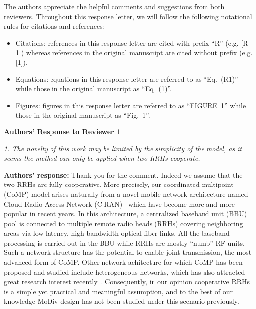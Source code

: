 \documentclass[onecolumn, 11pt, draftclsnofoot]{IEEEtran}
\begin{document}
The authors appreciate the helpful comments and suggestions from both reviewers. 
Throughout this response letter, we will follow the following notational
rules for citations and references:
\begin{itemize}
  \item Citations: references in this response letter are cited with prefix
  ``R'' (e.g. [R 1]) whereas references in the original manuscript are cited
  without prefix (e.g. [1]).
  \item Equations: equations in this response letter are referred to as
  ``Eq.~(R1)''  while those in the original manuscript as ``Eq.~(1)''.
  \item Figures: figures in this response letter are referred to as
  ``FIGURE~1''  while those in the original manuscript as ``Fig.~1''.
\end{itemize}

\begin{center}
  {\LARGE \textbf{Authors' Response to Reviewer 1}}
\end{center}


 
\noindent
\emph{1. The novelty of this work may be limited by the simplicity of the model,
as it seems the method can only be applied when two RRHs cooperate. }

\noindent \textbf{Authors' response:} 
Thank you for the comment. Indeed we assume that the two RRHs are fully
cooperative. More precisely, our coordinated multipoint (CoMP) model arises
naturally from a novel mobile network architecture named Cloud Radio Access
Network (C-RAN)~\citep[R][]{6897914}\citep[R][]{6923535} which have
become more and more popular in recent years. In this architecture, a
centralized baseband unit (BBU) pool is connected to multiple remote radio heads
(RRHs) covering neighboring areas via low latency, high bandwidth optical fiber
links. All the baseband processing is carried out in the BBU while RRHs are
mostly ``numb'' RF units. Such a network structure has the potential to enable
joint transmission, the most advanced form of CoMP. Other network achitecture
for which CoMP has been proposed and studied include heterogeneous networks,
which has also attracted great research interest
recently~\citep[R][]{6928420}\citep[R][]{6146489}. Consequently, in our opinion
cooperative RRHs is a simple yet practical and meaningful assumption, and
to the best of our knowledge MoDiv design has not been studied under this
scenario previously.
\end{document}
